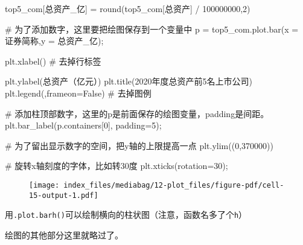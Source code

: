 \documentclass[
  letterpaper,
  DIV=11,
  numbers=noendperiod]{scrreprt}
\newenvironment{Shaded}{\begin{snugshade}}{\end{snugshade}}
\newcommand{\BuiltInTok}[1]{\textcolor[rgb]{0.00,0.23,0.31}{#1}}
\newcommand{\CommentTok}[1]{\textcolor[rgb]{0.37,0.37,0.37}{#1}}
\newcommand{\DecValTok}[1]{\textcolor[rgb]{0.68,0.00,0.00}{#1}}
\newcommand{\NormalTok}[1]{\textcolor[rgb]{0.00,0.23,0.31}{#1}}
\newcommand{\OperatorTok}[1]{\textcolor[rgb]{0.37,0.37,0.37}{#1}}
\newcommand{\StringTok}[1]{\textcolor[rgb]{0.13,0.47,0.30}{#1}}
\newcommand{\VariableTok}[1]{\textcolor[rgb]{0.07,0.07,0.07}{#1}}
\begin{document}
\begin{Shaded}
\begin{Highlighting}[]
\NormalTok{top5\_com[}\StringTok{\textquotesingle{}总资产\_亿\textquotesingle{}}\NormalTok{] }\OperatorTok{=} \BuiltInTok{round}\NormalTok{(top5\_com[}\StringTok{\textquotesingle{}总资产\textquotesingle{}}\NormalTok{] }\OperatorTok{/} \DecValTok{100000000}\NormalTok{,}\DecValTok{2}\NormalTok{)}

\CommentTok{\# 为了添加数字，这里要把绘图保存到一个变量中}
\NormalTok{p }\OperatorTok{=}\NormalTok{ top5\_com.plot.bar(x }\OperatorTok{=} \StringTok{\textquotesingle{}证券简称\textquotesingle{}}\NormalTok{,y }\OperatorTok{=} \StringTok{\textquotesingle{}总资产\_亿\textquotesingle{}}\NormalTok{)}\OperatorTok{;}

\NormalTok{plt.xlabel(}\StringTok{\textquotesingle{}\textquotesingle{}}\NormalTok{) }\CommentTok{\# 去掉行标签}

\NormalTok{plt.ylabel(}\StringTok{\textquotesingle{}总资产（亿元）\textquotesingle{}}\NormalTok{)}
\NormalTok{plt.title(}\StringTok{\textquotesingle{}2020年度总资产前5名上市公司\textquotesingle{}}\NormalTok{)}
\NormalTok{plt.legend(}\StringTok{\textquotesingle{}\textquotesingle{}}\NormalTok{,frameon}\OperatorTok{=}\VariableTok{False}\NormalTok{) }\CommentTok{\# 去掉图例}

\CommentTok{\# 添加柱顶部数字，这里的p是前面保存的绘图变量，padding是间距。}
\NormalTok{plt.bar\_label(p.containers[}\DecValTok{0}\NormalTok{], padding}\OperatorTok{=}\DecValTok{5}\NormalTok{)}\OperatorTok{;}

\CommentTok{\# 为了留出显示数字的空间，把y轴的上限提高一点}
\NormalTok{plt.ylim((}\DecValTok{0}\NormalTok{,}\DecValTok{370000}\NormalTok{))}

\CommentTok{\# 旋转x轴刻度的字体，比如转30度}
\NormalTok{plt.xticks(rotation}\OperatorTok{=}\DecValTok{30}\NormalTok{)}\OperatorTok{;} 
\end{Highlighting}
\end{Shaded}

\begin{figure}[H]

{\centering \texttt{[image: index\_files/mediabag/12-plot\_files/figure-pdf/cell-15-output-1.pdf]}

}

\end{figure}

用\texttt{.plot.barh()}可以绘制横向的柱状图（注意，函数名多了个\texttt{h}）

绘图的其他部分这里就略过了。
\end{document}
